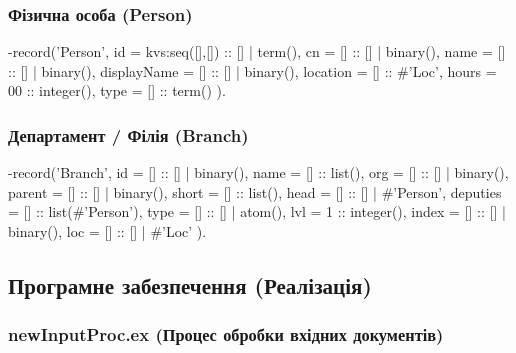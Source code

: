 \documentclass{article}
\let\originalfootnotesize\footnotesize
\let\oldverbatim\verbatim
\let\oldendverbatim\endverbatim
\renewenvironment{verbatim}{\originalfootnotesize\oldverbatim}{\oldendverbatim}
\begin{document}
\subsubsection{Фізична особа (Person)}
\begin{verbatim}
-record('Person',      { id          = kvs:seq([],[]) :: [] | term(),
                         cn          = [] :: [] | binary(),
                         name        = [] :: [] | binary(),
                         displayName = [] :: [] | binary(),
                         location    = [] :: #'Loc'{},
                         hours       = 00 :: integer(),
                         type        = [] :: term() }).
\end{verbatim}

\subsubsection{Департамент / Філія (Branch)}
\begin{verbatim}
-record('Branch',   { id     = [] :: [] | binary(),
                      name   = [] :: list(),
                      org    = [] :: [] | binary(),
                      parent = [] :: [] | binary(),
                      short  = [] :: list(),
                      head   = [] :: [] | #'Person'{},
                      deputies   = [] :: list(#'Person'{}),
                      type   = [] :: [] | atom(),
                      lvl    = 1 :: integer(),
                      index  = [] :: [] | binary(),
                      loc    = [] :: [] | #'Loc'{} }).
\end{verbatim}

\subsection{Програмне забезпечення (Реалізація)}

\subsubsection{newInputProc.ex (Процес обробки вхідних документів)}
\end{document}
